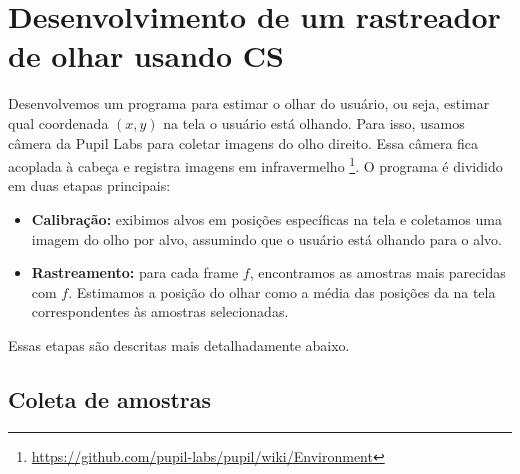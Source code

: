\chapter{Desenvolvimento de um rastreador de olhar usando CS}


Desenvolvemos um programa para estimar o olhar do usuário, ou seja, estimar qual coordenada $(x,y)$ na tela o usuário está olhando. Para isso, usamos câmera da Pupil Labs para coletar imagens do olho direito. Essa câmera fica acoplada à cabeça e registra imagens em infravermelho \footnote{\url{https://github.com/pupil-labs/pupil/wiki/Environment}}. O programa é dividido em duas etapas principais:

\begin{itemize}
\item {\bf Calibração:} exibimos alvos em posições específicas na tela e coletamos uma imagem do olho por alvo, assumindo que o usuário está olhando para o alvo.

\item {\bf Rastreamento:} para cada frame $f$, encontramos as amostras mais parecidas com $f$. Estimamos a posição do olhar como a média das posições da na tela correspondentes às amostras selecionadas.
\end{itemize}

Essas etapas são descritas mais detalhadamente abaixo.

\section{Coleta de amostras}


